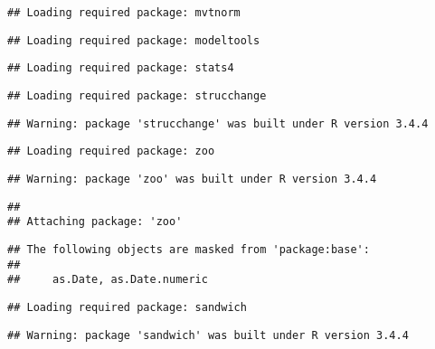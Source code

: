 \documentclass[]{article}
\begin{document}
\begin{verbatim}
## Loading required package: mvtnorm
\end{verbatim}

\begin{verbatim}
## Loading required package: modeltools
\end{verbatim}

\begin{verbatim}
## Loading required package: stats4
\end{verbatim}

\begin{verbatim}
## Loading required package: strucchange
\end{verbatim}

\begin{verbatim}
## Warning: package 'strucchange' was built under R version 3.4.4
\end{verbatim}

\begin{verbatim}
## Loading required package: zoo
\end{verbatim}

\begin{verbatim}
## Warning: package 'zoo' was built under R version 3.4.4
\end{verbatim}

\begin{verbatim}
## 
## Attaching package: 'zoo'
\end{verbatim}

\begin{verbatim}
## The following objects are masked from 'package:base':
## 
##     as.Date, as.Date.numeric
\end{verbatim}

\begin{verbatim}
## Loading required package: sandwich
\end{verbatim}

\begin{verbatim}
## Warning: package 'sandwich' was built under R version 3.4.4
\end{verbatim}
\end{document}
